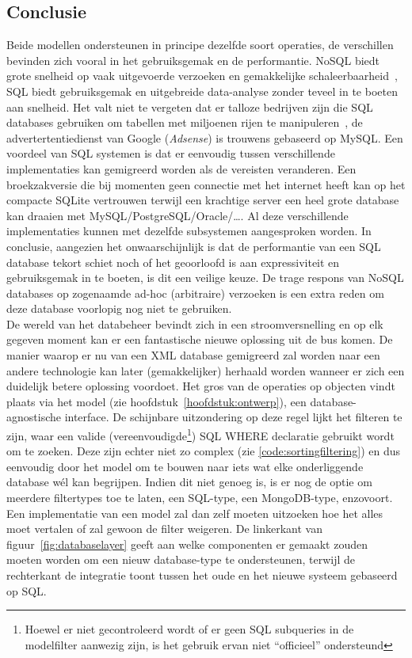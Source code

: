 \subsection{Conclusie}
Beide modellen ondersteunen in principe dezelfde soort operaties, de verschillen bevinden zich vooral in het gebruiksgemak en de performantie. NoSQL biedt grote snelheid op vaak uitgevoerde verzoeken en gemakkelijke schaleerbaarheid~\cite{cassandradatamodel}, SQL biedt gebruiksgemak en uitgebreide data-analyse zonder teveel in te boeten aan snelheid. Het valt niet te vergeten dat er talloze bedrijven zijn die SQL databases gebruiken om tabellen met miljoenen rijen te manipuleren~\cite{postgrescluster, mysqlcluster}, de advertertentiedienst van Google (\emph{Adsense}) is trouwens gebaseerd op MySQL. Een voordeel van SQL systemen is dat er eenvoudig tussen verschillende implementaties kan gemigreerd worden als de vereisten veranderen. Een broekzakversie die bij momenten geen connectie met het internet heeft kan op het compacte SQLite vertrouwen terwijl een krachtige server een heel grote database kan draaien met MySQL/PostgreSQL/Oracle/\ldots. Al deze verschillende implementaties kunnen met dezelfde subsystemen aangesproken worden. In conclusie, aangezien het onwaarschijnlijk is dat de performantie van een SQL database tekort schiet noch of het geoorloofd is aan expressiviteit en gebruiksgemak in te boeten, is dit een veilige keuze. De trage respons van NoSQL databases op zogenaamde ad-hoc (arbitraire) verzoeken is een extra reden om deze database voorlopig nog niet te gebruiken.\\

De wereld van het databeheer bevindt zich in een stroomversnelling en op elk gegeven moment kan er een fantastische nieuwe oplossing uit de bus komen. De manier waarop er nu van een XML database gemigreerd zal worden naar een andere technologie kan later (gemakkelijker) herhaald worden wanneer er zich een duidelijk betere oplossing voordoet. Het gros van de operaties op objecten vindt plaats via het model (zie hoofdstuk~\ref{hoofdstuk:ontwerp}), een database-agnostische interface. De schijnbare uitzondering op deze regel lijkt het filteren te zijn, waar een valide (vereenvoudigde\footnote{Hoewel er niet gecontroleerd wordt of er geen SQL subqueries in de modelfilter aanwezig zijn, is het gebruik ervan niet ``officieel'' ondersteund}) SQL WHERE declaratie gebruikt wordt om te zoeken. Deze zijn echter niet zo complex (zie \ref{code:sortingfiltering}) en dus eenvoudig door het model om te bouwen naar iets wat elke onderliggende database w\'el kan begrijpen. Indien dit niet genoeg is, is er nog de optie om meerdere filtertypes toe te laten, een SQL-type, een MongoDB-type, enzovoort. Een implementatie van een model zal dan zelf moeten uitzoeken hoe het alles moet vertalen of zal gewoon de filter weigeren. De linkerkant van figuur~\ref{fig:databaselayer} geeft aan welke componenten er gemaakt zouden moeten worden om een nieuw database-type te ondersteunen, terwijl de rechterkant de integratie toont tussen het oude en het nieuwe systeem gebaseerd op SQL.

